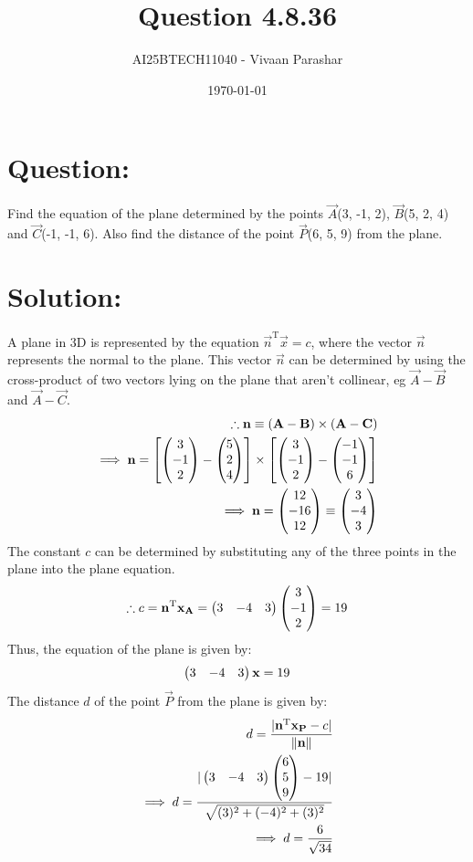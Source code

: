 \documentclass[a4paper, 12pt]{article}
\title{Question 4.8.36}
\author{AI25BTECH11040 - Vivaan Parashar}
\date{\today}
\begin{document}
\maketitle

\section{Question: }
Find the equation of the plane determined by the points $\vec{A}$(3, -1, 2), $\vec{B}$(5, 2, 4) and $\vec{C}$(-1, -1, 6). Also find the distance of the point $\vec{P}$(6, 5, 9) from the plane.

\section{Solution: }
A plane in 3D is represented by the equation $\vec{n}^\mathrm{T}\vec{x} = c$, where the vector $\vec{n}$ represents the normal to the plane.
This vector $\vec{n}$ can be determined by using the cross-product of two vectors lying on the plane that aren't collinear, eg $\vec{A} - \vec{B}$ and $\vec{A} - \vec{C}$.
\begin{align}
    \therefore \mathbf{n} \equiv (\mathbf{A}-\mathbf{B})\times(\mathbf{A}-\mathbf{C})\\
    \implies \mathbf{n} = \left[\begin{pmatrix}3 \\ -1 \\ 2\end{pmatrix} - \begin{pmatrix}5 \\ 2 \\ 4\end{pmatrix}\right] \times \left[\begin{pmatrix}3 \\ -1 \\ 2\end{pmatrix} - \begin{pmatrix}-1 \\ -1 \\ 6\end{pmatrix}\right]\\
    \implies \mathbf{n} = \begin{pmatrix}12 \\ -16 \\ 12\end{pmatrix} \equiv \begin{pmatrix}3 \\ -4 \\ 3\end{pmatrix}
\end{align}
The constant $c$ can be determined by substituting any of the three points in the plane into the plane equation.
\begin{align}
    \therefore c = \mathbf{n}^\mathrm{T}\mathbf{x_A} = \begin{pmatrix}3 & -4 & 3\end{pmatrix}\begin{pmatrix}3 \\ -1 \\ 2\end{pmatrix} = 19
\end{align}
Thus, the equation of the plane is given by:
\begin{align}
    \begin{pmatrix}3 & -4 & 3\end{pmatrix}\mathbf{x} = 19
\end{align}
The distance $d$ of the point $\vec{P}$ from the plane is given by:
\begin{align}
    d = \frac{|\mathbf{n}^\mathrm{T}\mathbf{x_P} - c|}{\|\mathbf{n}\|}\\
    \implies d = \frac{|\begin{pmatrix}3 & -4 & 3\end{pmatrix}\begin{pmatrix}6 \\ 5 \\ 9\end{pmatrix} - 19|}{\sqrt{(3)^2 + (-4)^2 + (3)^2}}\\
    \implies d = \frac{6}{\sqrt{34}}
\end{align}
\end{document}
